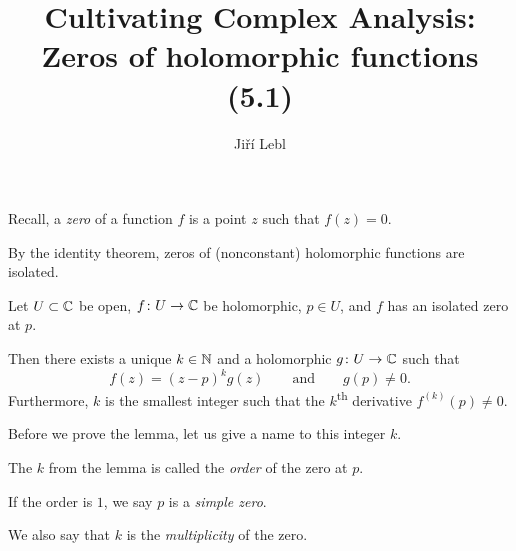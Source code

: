 \documentclass[10pt,aspectratio=169]{beamer}
\author{Ji\v{r}\'i Lebl}
\institute[OSU]{%
Departemento pri Matematiko de Oklahoma {\^S}tata Universitato}
\title{Cultivating Complex Analysis:\\%
Zeros of holomorphic functions (5.1)}
\date{}
\begin{document}
\begin{frame}
\titlepage
\end{frame}

\begin{frame}
Recall, a \emph{zero} of a function $f$ is a point $z$ such that $f(z) = 0$.

\medskip
\pause

By the identity theorem,
zeros of (nonconstant) holomorphic functions are isolated.
\pause

\begin{lemma}
Let $U \subset {\mathbb{C}}$ be open, $f \colon U \to {\mathbb{C}}$ be holomorphic, $p \in U$,
and $f$ has an isolated zero at $p$.

\pause
Then there exists a unique $k \in {\mathbb{N}}$ and a holomorphic $g \colon U
\to {\mathbb{C}}$ such that
\[
f(z) = {(z-p)}^k g(z)
\qquad
\text{and} \qquad
g(p) \not= 0 .
\]
\pause
Furthermore, $k$ is the smallest integer such that the $k$\textsuperscript{th}
derivative $f^{(k)}(p) \not= 0$.
\end{lemma}

\pause

Before we prove the lemma, let us give a name to this integer $k$.

\pause

\begin{definition}
The $k$ from the lemma is called the \emph{order}
of the zero at $p$.
\pause

If the order is $1$, we say $p$ is a \emph{simple zero}.

\pause

We also say that $k$ is the \emph{multiplicity} of the zero.
\end{definition}
\end{frame}
\end{document}
